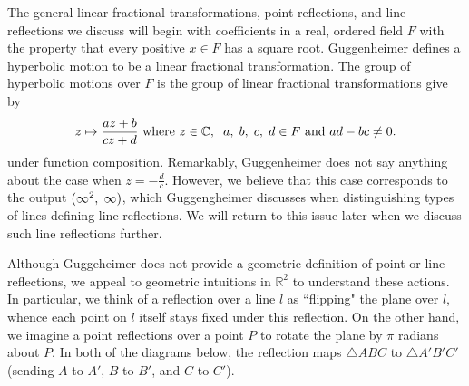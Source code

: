 \documentclass[12pt]{article}
\newcommand{\R}{\mathbb{R}}
\newcommand{\C}{\mathbb{C}}
\newcommand{\ttc}{, \hspace{1mm}}
\newcommand{\specialend}{(\infty^2\ttc\infty)}
\theoremstyle{plain}
\theoremstyle{definition}
\begin{document}
The general linear fractional transformations, point reflections, and line reflections we discuss will begin with coefficients in a real, ordered field $F$ with the property that every positive $x \in F$ has a square root. Guggenheimer defines a hyperbolic motion to be a linear fractional transformation. The group of hyperbolic motions over $F$ is the group of linear fractional transformations \cite{shuman_lfts} give by
\begin{equation} 
	z \mapsto \frac{az+b}{cz+d} \text{ where } z \in \C, \hspace{2mm} a \ttc b \ttc c \ttc d \in F \text{ and } ad-bc \neq 0. 
\end{equation}
under function composition. Remarkably, Guggenheimer does not say anything about the case when $z = -\frac{d}{c}$. However, we believe that this case corresponds to the output $\specialend$, which Guggengheimer discusses when distinguishing types of lines defining line reflections. We will return to this issue later when we discuss such line reflections further. 

Although Guggeheimer does not provide a geometric definition of point or line reflections, we appeal to geometric intuitions in $\R^2$ to understand these actions. In particular, we think of a reflection over a line $l$ as ``flipping" the plane over $l$, whence each point on $l$ itself stays fixed under this reflection. On the other hand, we imagine a point reflections over a point $P$ to rotate the plane by $\pi$ radians about $P$. In both of the diagrams below, the reflection maps $\triangle ABC$ to $\triangle A'B'C'$ (sending $A$ to $A'$, $B$ to $B'$, and $C$ to $C'$). 
\end{document}
